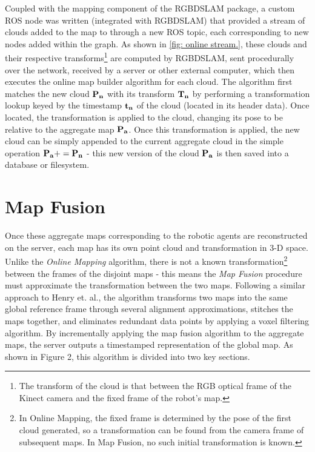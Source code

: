 \documentclass[letterpaper, oneside, 10pt]{report}
\begin{document}
Coupled with the mapping component of the RGBDSLAM package, a custom ROS node was written (integrated with RGBDSLAM) that provided a stream of clouds added to the map to through a new ROS topic, each corresponding to new nodes added within the graph. As shown in \ref{fig: online stream.}, these clouds and their respective transforms\footnote{The transform of the cloud is that between the RGB optical frame of the Kinect camera and the fixed frame of the robot's map.} are computed by RGBDSLAM, sent procedurally over the network, received by a server or other external computer, which then executes the online map builder algorithm for each cloud. The algorithm first matches the new cloud $\bf{P_n}$ with its transform $\bf{T_n}$ by performing a transformation lookup keyed by the timestamp $\bf{t_n}$ of the cloud (located in its header data). Once located, the transformation is applied to the cloud, changing its pose to be relative to the aggregate map $\bf{P_a}$. Once this transformation is applied, the new cloud can be simply appended to the current aggregate cloud in the simple operation $\bf{P_a} += \bf{P_n}$  - this new version of the cloud $\bf{P_a}$ is then saved into a database or filesystem.

\section{Map Fusion}
\noindent Once these aggregate maps corresponding to the robotic agents are reconstructed on the server, each map has its own point cloud and transformation in 3-D space. Unlike the \textsl{Online Mapping} algorithm, there is not a known transformation\footnote{In Online Mapping, the fixed frame is determined by the pose of the first cloud generated, so a transformation can be found from the camera frame of subsequent maps. In Map Fusion, no such initial transformation is known.} between the frames of the disjoint maps - this means the \textsl{Map Fusion} procedure must approximate the transformation between the two maps. Following a similar approach to Henry et. al.\cite{henry2012rgb}, the algorithm transforms two maps into the same global reference frame through several alignment approximations, stitches the maps together, and eliminates redundant data points by applying a voxel filtering algorithm. By incrementally applying the map fusion algorithm to the aggregate maps, the server outputs a timestamped representation of the global map. As shown in Figure 2, this algorithm is divided into two key sections.
\end{document}

